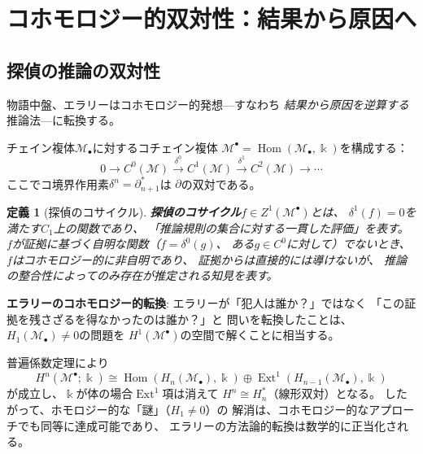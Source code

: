 \documentclass[12pt,twocolumn]{ltjsarticle}
\newtheorem{definition}[theorem]{定義}
\newcommand{\Hom}{\operatorname{Hom}}
\newcommand{\Ext}{\operatorname{Ext}}
\newcommand{\Mys}{\mathcal{M}}
\newcommand{\kk}{\Bbbk}
\begin{document}
\section{コホモロジー的双対性：結果から原因へ}
\label{sec:cohomology}

\subsection{探偵の推論の双対性}

物語中盤、エラリーはコホモロジー的発想---すなわち
\emph{結果から原因を逆算する}推論法---に転換する。

チェイン複体$\Mys_\bullet$に対するコチェイン複体
$\Mys^\bullet = \Hom(\Mys_\bullet, \kk)$を構成する：
\begin{equation}
0 \to C^0(\Mys) \xrightarrow{\delta^0}
C^1(\Mys) \xrightarrow{\delta^1}
C^2(\Mys) \to \cdots
\end{equation}
ここでコ境界作用素$\delta^n = \partial_{n+1}^*$は
$\partial$の双対である。

\begin{definition}[探偵のコサイクル]
\textbf{探偵のコサイクル}$f \in Z^1(\Mys^\bullet)$とは、
$\delta^1(f) = 0$を満たす$C_1$上の関数であり、
「推論規則の集合に対する\emph{一貫した評価}」を表す。
$f$が証拠に基づく自明な関数（$f = \delta^0(g)$、
ある$g \in C^0$に対して）でないとき、
$f$はコホモロジー的に非自明であり、
\emph{証拠からは直接的には導けないが、
推論の整合性によってのみ存在が推定される知見}を表す。
\end{definition}

\textbf{エラリーのコホモロジー的転換}:
エラリーが「犯人は誰か？」ではなく
「この証拠を残さざるを得なかったのは誰か？」と
問いを転換したことは、
$H_1(\Mys_\bullet) \neq 0$の問題を
$H^1(\Mys^\bullet)$の空間で解くことに相当する。

普遍係数定理により
\begin{equation}
H^n(\Mys^\bullet;\kk) \cong \Hom(H_n(\Mys_\bullet), \kk)
\oplus \Ext^1(H_{n-1}(\Mys_\bullet), \kk)
\end{equation}
が成立し、$\kk$が体の場合$\Ext^1$項は消えて
$H^n \cong H_n^*$（線形双対）となる。
したがって、ホモロジー的な「謎」（$H_1 \neq 0$）の
解消は、コホモロジー的なアプローチでも同等に達成可能であり、
エラリーの方法論的転換は数学的に正当化される。


\end{document}
